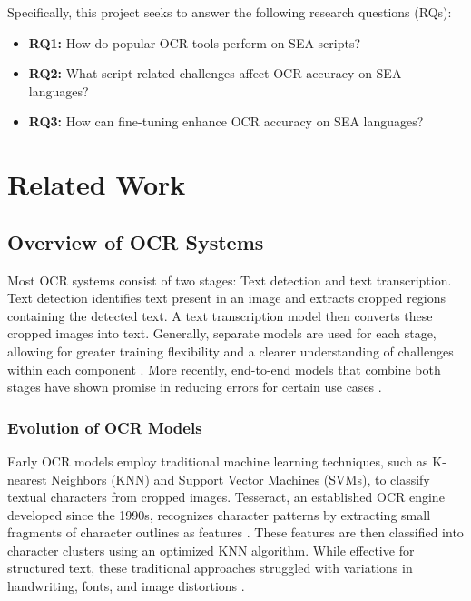 \documentclass[12pt,oneside]{memoir}
\begin{document}
Specifically, this project seeks to answer the following research questions (RQs):

\begin{itemize}
    \item \textbf{RQ1:} How do popular OCR tools perform on SEA scripts?
    \item \textbf{RQ2:} What script-related challenges affect OCR accuracy on SEA languages?
    \item \textbf{RQ3:} How can fine-tuning enhance OCR accuracy on SEA languages?
\end{itemize}

\chapter{Related Work}

\section{Overview of OCR Systems}

Most OCR systems consist of two stages: Text detection and text transcription.
Text detection identifies text present in an image and extracts cropped regions containing the detected text. 
A text transcription model then converts these cropped images into text.
Generally, separate models are used for each stage, allowing for greater training flexibility and a clearer understanding of challenges within each component \parencite{subramani-etal-2023}. 
More recently, end-to-end models that combine both stages have shown promise in reducing errors for certain use cases \parencite{feng-etal-2019}.

\subsection{Evolution of OCR Models}

Early OCR models employ traditional machine learning techniques, such as K-nearest Neighbors (KNN) and Support Vector Machines (SVMs), to classify textual characters from cropped images.
Tesseract, an established OCR engine developed since the 1990s, recognizes character patterns by extracting small fragments of character outlines as features \parencite{smith-2013}.
These features are then classified into character clusters using an optimized KNN algorithm.
While effective for structured text, these traditional approaches struggled with variations in handwriting, fonts, and image distortions \parencite{subramani-etal-2023}.
\end{document}

